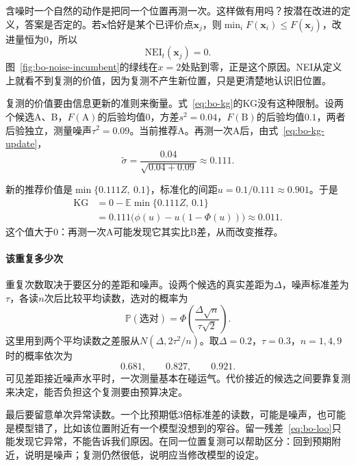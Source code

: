 含噪时一个自然的动作是把同一个位置再测一次。这样做有用吗？按潜在改进的定义，答案是否定的。若$\bm{x}$恰好是某个已评价点$\bm{x}_j$，则$\min_iF(\bm{x}_i)\leq F(\bm{x}_j)$，改进量恒为$0$，所以
\begin{equation}
 \mathrm{NEI}_t(\bm{x}_j)=0.
 \label{eq:bo-nei-zero}
\end{equation}
图~\ref{fig:bo-noise-incumbent}的绿线在$x=2$处贴到零，正是这个原因。NEI从定义上就看不到复测的价值，因为复测不产生新位置，只是更清楚地认识旧位置。

复测的价值要由信息更新的准则来衡量。式~\eqref{eq:bo-kg}的KG没有这种限制。设两个候选A、B，$F(\text{A})$的后验均值$0$，方差$s^2=0.04$，$F(\text{B})$的后验均值$0.1$，两者后验独立，测量噪声$\tau^2=0.09$。当前推荐A。再测一次A后，由式~\eqref{eq:bo-kg-update}，
\[
 \widetilde{\sigma}=\frac{0.04}{\sqrt{0.04+0.09}}\approx0.111.
\]

新的推荐价值是$\min\{0.111Z,\ 0.1\}$，标准化的间距$u=0.1/0.111\approx0.901$。于是
\[
 \begin{aligned}
 \mathrm{KG}&=0-\mathbb{E}\min\{0.111Z,\,0.1\}\\
 &=0.111\bigl(\phi(u)-u(1-\Phi(u))\bigr)\approx0.011.
 \end{aligned}
\]
这个值大于$0$：再测一次A可能发现它其实比B差，从而改变推荐。

\paragraph{该重复多少次}
重复次数取决于要区分的差距和噪声。设两个候选的真实差距为$\Delta$，噪声标准差为$\tau$，各读$n$次后比较平均读数，选对的概率为
\begin{equation}
 \mathbb{P}(\text{选对})=\Phi\left(\frac{\Delta\sqrt{n}}{\tau\sqrt{2}}\right).
 \label{eq:bo-correct-selection}
\end{equation}
这里用到两个平均读数之差服从$N(\Delta,2\tau^2/n)$。取$\Delta=0.2$，$\tau=0.3$，$n=1,4,9$时的概率依次为
\[
 0.681,\qquad 0.827,\qquad 0.921.
\]
可见差距接近噪声水平时，一次测量基本在碰运气。代价接近的候选之间要靠复测来决定，能否负担这个复测要由预算决定。

最后要留意单次异常读数。一个比预期低$3$倍标准差的读数，可能是噪声，也可能是模型错了，比如该位置附近有一个模型没想到的窄谷。留一残差~\eqref{eq:bo-loo}只能发现它异常，不能告诉我们原因。在同一位置复测可以帮助区分：回到预期附近，说明是噪声；复测仍然很低，说明应当修改模型的设定。
